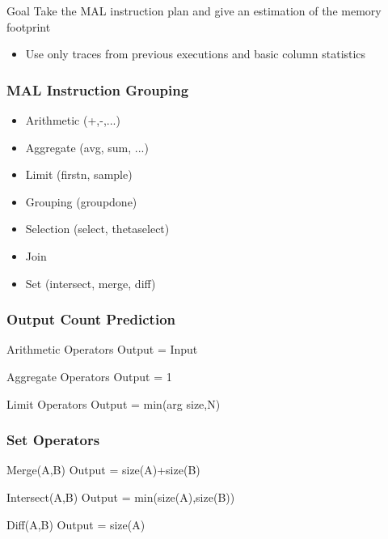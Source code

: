 \begin{frame}[fragile]
\begin{block}{Goal}
Take the MAL instruction plan and
give an estimation of the memory footprint
\begin{itemize}
\item Use only traces from previous executions and basic column statistics
\end{itemize}
\end{block}
\end{frame}

\begin{frame}[fragile]
\frametitle{MAL Instruction Grouping}
\begin{itemize}
\item Arithmetic (+,-,...)
\item Aggregate (avg, sum, ...)
\item Limit (firstn, sample)
\item Grouping (groupdone)
\item Selection (select, thetaselect)
\item Join
\item Set (intersect, merge, diff)
\end{itemize}
\end{frame}

\begin{frame}
\frametitle{Output Count Prediction}
\begin{block}{Arithmetic Operators}
Output = Input
\end{block}
\begin{block}{Aggregate Operators}
Output = 1
\end{block}
\begin{block}{Limit Operators}
Output = min(arg size,N)
\end{block}
\end{frame}

\begin{frame}
\frametitle{Set Operators}
\begin{block}{Merge(A,B)}
Output = size(A)+size(B)
\end{block}
\begin{block}{Intersect(A,B)}
Output = min(size(A),size(B))
\end{block}
\begin{block}{Diff(A,B)}
Output = size(A)
\end{block}
\end{frame}

